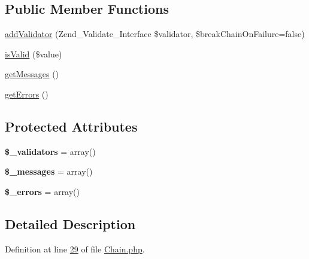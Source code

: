 \subsection*{Public Member Functions}
\begin{DoxyCompactItemize}
\item 
\hyperlink{classZendDbSchema__Validate__Db__Schema__Chain_af742ed5183899ec20d08fd5b80320247}{add\-Validator} (Zend\-\_\-\-Validate\-\_\-\-Interface \$validator, \$break\-Chain\-On\-Failure=false)
\item 
\hyperlink{classZendDbSchema__Validate__Db__Schema__Chain_a42447dfac2fe8e5c0eae92b424066538}{is\-Valid} (\$value)
\item 
\hyperlink{classZendDbSchema__Validate__Db__Schema__Chain_a93c9a6c17bc08b49e00ef5b47e98c890}{get\-Messages} ()
\item 
\hyperlink{classZendDbSchema__Validate__Db__Schema__Chain_a397059e4fe068b1deb48a057a5cdab93}{get\-Errors} ()
\end{DoxyCompactItemize}
\subsection*{Protected Attributes}
\begin{DoxyCompactItemize}
\item 
\hypertarget{classZendDbSchema__Validate__Db__Schema__Chain_addc149c3ceea8a32028618f754882528}{{\bfseries \$\-\_\-validators} = array()}\label{classZendDbSchema__Validate__Db__Schema__Chain_addc149c3ceea8a32028618f754882528}

\item 
\hypertarget{classZendDbSchema__Validate__Db__Schema__Chain_a64fa6c884c0da9ec56e4ebea8485be3f}{{\bfseries \$\-\_\-messages} = array()}\label{classZendDbSchema__Validate__Db__Schema__Chain_a64fa6c884c0da9ec56e4ebea8485be3f}

\item 
\hypertarget{classZendDbSchema__Validate__Db__Schema__Chain_a9c4c4dceda7c4d4fca9712dd59539f58}{{\bfseries \$\-\_\-errors} = array()}\label{classZendDbSchema__Validate__Db__Schema__Chain_a9c4c4dceda7c4d4fca9712dd59539f58}

\end{DoxyCompactItemize}


\subsection{Detailed Description}


Definition at line \hyperlink{Chain_8php_source_l00029}{29} of file \hyperlink{Chain_8php_source}{Chain.\-php}.



